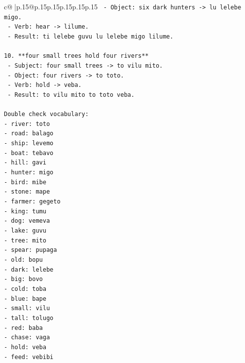 \documentclass{article}
\begin{document}
{\begin{supertabular}{c@{$\;$}|p{.15\linewidth}@{}p{.15\linewidth}p{.15\linewidth}p{.15\linewidth}p{.15\linewidth}p{.15\linewidth}}
{{{\texttt{    {-} Object: six dark hunters {-}> lu lelebe migo.} \\
\texttt{    {-} Verb: hear {-}> lilume.} \\
\texttt{    {-} Result: ti lelebe guvu lu lelebe migo lilume.} \\
\\ 
\texttt{10. **four small trees hold four rivers**} \\
\texttt{    {-} Subject: four small trees {-}> to vilu mito.} \\
\texttt{    {-} Object: four rivers {-}> to toto.} \\
\texttt{    {-} Verb: hold {-}> veba.} \\
\texttt{    {-} Result: to vilu mito to toto veba.} \\
\\ 
\texttt{Double check vocabulary:} \\
\texttt{{-} river: toto} \\
\texttt{{-} road: balago} \\
\texttt{{-} ship: levemo} \\
\texttt{{-} boat: tebavo} \\
\texttt{{-} hill: gavi} \\
\texttt{{-} hunter: migo} \\
\texttt{{-} bird: mibe} \\
\texttt{{-} stone: mape} \\
\texttt{{-} farmer: gegeto} \\
\texttt{{-} king: tumu} \\
\texttt{{-} dog: vemeva} \\
\texttt{{-} lake: guvu} \\
\texttt{{-} tree: mito} \\
\texttt{{-} spear: pupaga} \\
\texttt{{-} old: bopu} \\
\texttt{{-} dark: lelebe} \\
\texttt{{-} big: bovo} \\
\texttt{{-} cold: toba} \\
\texttt{{-} blue: bape} \\
\texttt{{-} small: vilu} \\
\texttt{{-} tall: tolugo} \\
\texttt{{-} red: baba} \\
\texttt{{-} chase: vaga} \\
\texttt{{-} hold: veba} \\
\texttt{{-} feed: vebibi} \\
}}}
\end{supertabular}}
\end{document}
